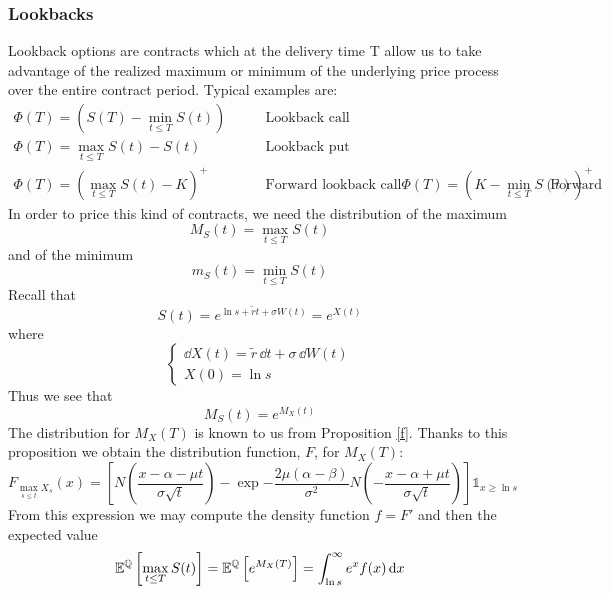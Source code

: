 \subsubsection{Lookbacks}
Lookback options are contracts which at the delivery time T allow us to take advantage of the realized maximum or minimum of the underlying price process over the entire contract period. Typical examples are:
\begin{align*}
    \Phi(T) = (S(T)-\min_{t\le T}S(t)) \qquad &\text{Lookback call} \\
    \Phi(T) = \max_{t\le T}S(t) - S(t) \qquad &\text{Lookback put} \\
    \Phi(T) = \left(\max_{t\le T}S(t) - K\right)^+ \qquad &\text{Forward lookback call}
    \Phi(T) = \left(K-\min_{t\le T}S(t)\right)^+ \qquad &\text{Forward lookback put}
\end{align*}
In order to price this kind of contracts, we need the distribution of the maximum
\begin{equation}
    M_S(t) = \max_{t\le T} S(t)
\end{equation}
and of the minimum
\begin{equation}
    m_S(t) = \min_{t\le T} S(t)
\end{equation}
Recall that
\begin{equation*}
    S(t) = e^{\ln s + \tilde{r} t + \sigma W(t)} = e^{X(t)}
\end{equation*}
where
\begin{equation*}
    \begin{cases}
        \dd X(t) = \tilde{r}\,\dd t + \sigma\,\dd W(t) \\
        X(0) = \ln s
    \end{cases}
\end{equation*}
Thus we see that
\begin{equation*}
    M_S(t) = e^{M_X(t)}
\end{equation*}
The distribution for $M_X(T)$ is known to us from Proposition \ref{f}. Thanks to this proposition we obtain the distribution function, $F$, for $M_X(T)$:
\begin{equation}
    F_{\max_{s\le t}X_s}(x) = \left[
    N\left(\frac{x-\alpha-\mu t}{\sigma\sqrt{t}}\right)
    -\exp{-\frac{2\mu(\alpha-\beta)}{\sigma^2}}N\left(-\frac{x-\alpha+\mu t}{\sigma\sqrt{t}}\right)
    \right]\mathds{1}_{x\ge\ln s}
\end{equation}
From this expression we may compute the density function $f=F'$ and then the expected value
\begin{equation}
    \mathbb{E}^{\mathbb{Q}}\left[\max_{t\le T}S(t)\right] = \mathbb{E}^{\mathbb{Q}}\left[e^{M_X(T)}\right] = \int_{\ln s}^{\infty}e^x f(x)\,\dd x
\end{equation}
